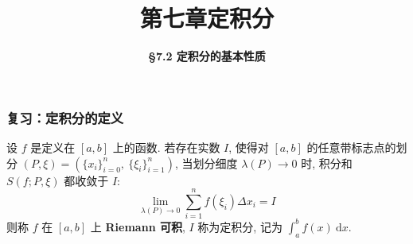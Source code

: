 \everymath{\displaystyle}



\title[第七章\\
定积分]{\texorpdfstring{\LARGE \bfseries 第七章\quad 定积分}{第七章 定积分}} %
\author[\smaller \S 7.2\\
定积分基本性质] %
{\Large \bfseries \S 7.2 定积分的基本性质}
\date{}





\begin{frame}

\titlepage %

\end{frame}





\begin{frame}
\frametitle{复习：定积分的定义}
\begin{Def}[Riemann 积分]
设 $f$ 是定义在 $[a,b]$ 上的函数. 若存在实数 $I$, 使得对 $[a,b]$ 的任意带标志点的划分 $(P, \xi) = (\{x_i\}_{i=0}^n,\ \{\xi_i\}_{i=1}^n)$, 当划分细度 $\lambda(P) \to 0$ 时, 积分和 $S(f; P, \xi)$ 都收敛于 $I$:
\[ \lim_{\lambda(P) \to 0} \sum_{i=1}^n f(\xi_i) \Delta x_i = I \]
则称 $f$ 在 $[a,b]$ 上 \textbf{Riemann 可积}, $I$ 称为定积分, 记为 $\int_a^b f(x) ~ \mathrm{d}x$.
\end{Def}
\end{frame}

